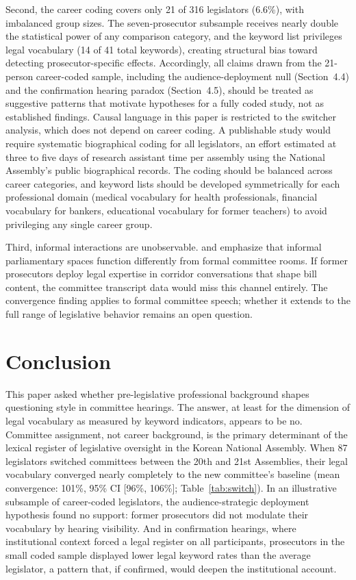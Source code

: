 \documentclass[11pt]{article}
\begin{document}
Second, the career coding covers only 21 of 316 legislators (6.6\%), with imbalanced group sizes. The seven-prosecutor subsample receives nearly double the statistical power of any comparison category, and the keyword list privileges legal vocabulary (14 of 41 total keywords), creating structural bias toward detecting prosecutor-specific effects. Accordingly, all claims drawn from the 21-person career-coded sample, including the audience-deployment null (Section~4.4) and the confirmation hearing paradox (Section~4.5), should be treated as suggestive patterns that motivate hypotheses for a fully coded study, not as established findings. Causal language in this paper is restricted to the switcher analysis, which does not depend on career coding. A publishable study would require systematic biographical coding for all legislators, an effort estimated at three to five days of research assistant time per assembly using the National Assembly's public biographical records. The coding should be balanced across career categories, and keyword lists should be developed symmetrically for each professional domain (medical vocabulary for health professionals, financial vocabulary for bankers, educational vocabulary for former teachers) to avoid privileging any single career group.

Third, informal interactions are unobservable. \citet{norton2018} and \citet{crewe2021} emphasize that informal parliamentary spaces function differently from formal committee rooms. If former prosecutors deploy legal expertise in corridor conversations that shape bill content, the committee transcript data would miss this channel entirely. The convergence finding applies to formal committee speech; whether it extends to the full range of legislative behavior remains an open question.


\section{Conclusion}
\label{sec:conclusion}

This paper asked whether pre-legislative professional background shapes questioning style in committee hearings. The answer, at least for the dimension of legal vocabulary as measured by keyword indicators, appears to be no. Committee assignment, not career background, is the primary determinant of the lexical register of legislative oversight in the Korean National Assembly. When 87 legislators switched committees between the 20th and 21st Assemblies, their legal vocabulary converged nearly completely to the new committee's baseline (mean convergence: 101\%, 95\% CI [96\%, 106\%]; Table~\ref{tab:switch}). In an illustrative subsample of career-coded legislators, the audience-strategic deployment hypothesis found no support: former prosecutors did not modulate their vocabulary by hearing visibility. And in confirmation hearings, where institutional context forced a legal register on all participants, prosecutors in the small coded sample displayed lower legal keyword rates than the average legislator, a pattern that, if confirmed, would deepen the institutional account.
\end{document}
